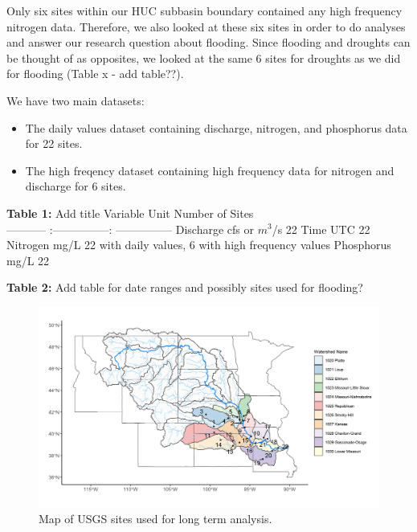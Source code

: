 \documentclass[12pt,]{article}
\makeatletter
\def\maxwidth{\ifdim\Gin@nat@width>\linewidth\linewidth\else\Gin@nat@width\fi}
\makeatother
\begin{document}
Only six sites within our HUC subbasin boundary contained any high
frequency nitrogen data. Therefore, we also looked at these six sites in
order to do analyses and answer our research question about flooding.
Since flooding and droughts can be thought of as opposites, we looked at
the same 6 sites for droughts as we did for flooding (Table x - add
table??).

We have two main datasets:

\begin{itemize}
\item
  The daily values dataset containing discharge, nitrogen, and
  phosphorus data for 22 sites.
\item
  The high freqency dataset containing high frequency data for nitrogen
  and discharge for 6 sites.
\end{itemize}

\textbf{Table 1:} Add title Variable \textbar{} Unit \textbar{} Number
of Sites \textbar{}\\
----------- \textbar{} :---------------: \textbar{} ---------------
\textbar{} Discharge \textbar{} cfs or \(m^{3}\)/s \textbar{} 22 Time
\textbar{} UTC \textbar{} 22 Nitrogen \textbar{} mg/L \textbar{} 22 with
daily values, 6 with high frequency values Phosphorus \textbar{} mg/L
\textbar{} 22

\textbf{Table 2:} Add table for date ranges and possibly sites used for
flooding?

\begin{figure}[H]
\includegraphics[width=\maxwidth]{../Figures/site_map} \caption{\label{fig:sitemap} Map of USGS sites used for long term analysis.}\label{fig:sitemap}
\end{figure}

\newpage
\end{document}
